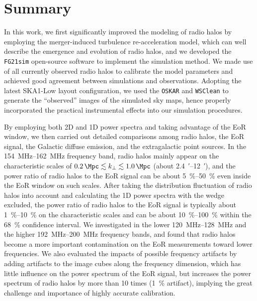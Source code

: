 \documentclass[modern]{aastex62}
\newcommand{\kperp}{\text{$k_{\bot}$}}
\begin{document}
\section{Summary}
\label{sec:summary}

In this work, we first significantly improved the modeling of radio halos
by employing the merger-induced turbulence re-acceleration model, which
can well describe the emergence and evolution of radio halos,
and we developed the \texttt{FG21sim} open-source software to implement
the simulation method.
We made use of all currently observed radio halos to calibrate the model
parameters and achieved good agreement between simulations and observations.
Adopting the latest SKA1-Low layout configuration, we used the
\texttt{OSKAR} and \texttt{WSClean} to generate the \enquote{observed}
images of the simulated sky maps, hence properly incorporated the
practical instrumental effects into our simulation procedures.

By employing both 2D and 1D power spectra and taking advantage of the
EoR window, we then carried out detailed comparisons among radio halos,
the EoR signal, the Galactic diffuse emission, and the extragalactic
point sources.
In the \SIrange{154}{162}{\MHz} frequency band, radio halos mainly
appear on the characteristic scales of
$\SI{0.2}{\per\Mpc} \lesssim \kperp \lesssim \SI{1.0}{\per\Mpc}$
(about \SIrange[range-units=repeat]{2.4}{12}{\arcminute}),
and the power ratio of radio halos to the EoR signal can be about
\SIrange[range-units=repeat]{5}{50}{\percent} even inside the EoR window
on such scales.
After taking the distribution fluctuation of radio halos into account
and calculating the 1D power spectra with the wedge excluded, the power
ratio of radio halos to the EoR signal is typically about
\SIrange[range-units=repeat]{1}{10}{\percent} on the characteristic
scales and can be about \SIrange[range-units=repeat]{10}{100}{\percent}
within the \SI{68}{\percent} confidence interval.
We investigated in the lower \SIrange{120}{128}{\MHz} and the higher
\SIrange{192}{200}{\MHz} frequency bands, and found that radio halos
become a more important contamination on the EoR measurements toward
lower frequencies.
We also evaluated the impacts of possible frequency artifacts by adding
artifacts to the image cubes along the frequency dimension, which has
little influence on the power spectrum of the EoR signal, but increases
the power spectrum of radio halos by more than 10 times (\SI{1}{\percent}
artifact), implying the great challenge and importance of highly accurate
calibration.
\end{document}
